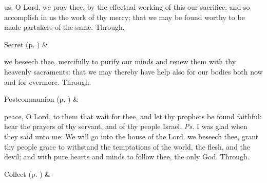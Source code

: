 
\secret
{} us, O Lord, we pray thee, by the effectual working of this our sacrifice: and so accomplish in us the work of thy mercy; that we may be found worthy to be made partakers of the same. Through.
\begin{rubric}
     Secret  (p. \pageref{SPSaints}) \&  
\end{rubric}

\postcommunion
{} we beseech thee, mercifully to purify our minds and renew them with thy heavenly sacraments: that we may thereby have help also for our bodies both now and for evermore. Through.
\begin{rubric}
     Postcommunion  (p. \pageref{SPSaints}) \&  
\end{rubric}


\clearpage
{}


\introit
{} peace, O Lord, to them that wait for thee, and let thy prophets be found faithful: hear the prayers of thy servant, and of thy people Israel. \textit{Ps.} I was glad when they said unto me: We will go into the house of the Lord.
\collect
{} we beseech thee, grant thy people grace to withstand the temptations of the world, the flesh, and the devil; and with pure hearts and minds to follow thee, the only God. Through.
\begin{rubric}
     Collect  (p. \pageref{SPSaints}) \&  
\end{rubric}

